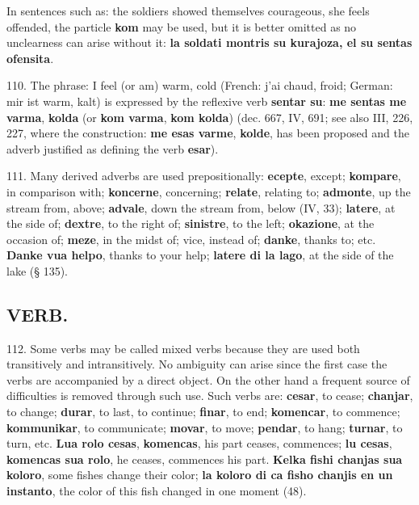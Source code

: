 In sentences such as: the soldiers showed themselves courageous, she feels offended, the particle \textbf{kom} may be used, but it is better omitted as no unclearness can arise without it: \textbf{la soldati montris su kurajoza, el su sentas ofensita}.

110. The phrase: I feel (or am) warm, cold (French: j'ai chaud, froid; German: mir ist warm, kalt) is expressed by the reflexive verb \textbf{sentar su}: \textbf{me sentas me varma}, \textbf{kolda} (or \textbf{kom varma}, \textbf{kom kolda}) (dec. 667, IV, 691; see also III, 226, 227, where the construction: \textbf{me esas varme}, \textbf{kolde}, has been proposed and the adverb justified as defining the verb \textbf{esar}).

111. Many derived adverbs are used prepositionally: \textbf{ecepte}, except; \textbf{kompare}, in comparison with; \textbf{koncerne}, concerning; \textbf{relate}, relating to; \textbf{admonte}, up the stream from, above; \textbf{advale}, down the stream from, below (IV, 33); \textbf{latere}, at the side of; \textbf{dextre}, to the right of; \textbf{sinistre}, to the left; \textbf{okazione}, at the occasion of; \textbf{meze}, in the midst of; vice, instead of; \textbf{danke}, thanks to; etc. \textbf{Danke vua helpo}, thanks to your help; \textbf{latere di la lago}, at the side of the lake (§ 135).

\subsection*{VERB.}
112. Some verbs may be called mixed verbs because they are used both transitively and intransitively. No ambiguity can arise since the first case the verbs are accompanied by a direct object. On the other hand a frequent source of difficulties is removed through such use. Such verbs are: \textbf{cesar}, to cease; \textbf{chanjar}, to change; \textbf{durar}, to last, to continue; \textbf{finar}, to end; \textbf{komencar}, to commence; \textbf{kommunikar}, to communicate; \textbf{movar}, to move; \textbf{pendar}, to hang; \textbf{turnar}, to turn, etc. \textbf{Lua rolo cesas}, \textbf{komencas}, his part ceases, commences; \textbf{lu cesas}, \textbf{komencas sua rolo}, he ceases, commences his part. \textbf{Kelka fishi chanjas sua koloro}, some fishes change their color; \textbf{la koloro di ca fisho chanjis en un instanto}, the color of this fish changed in one moment (48).


